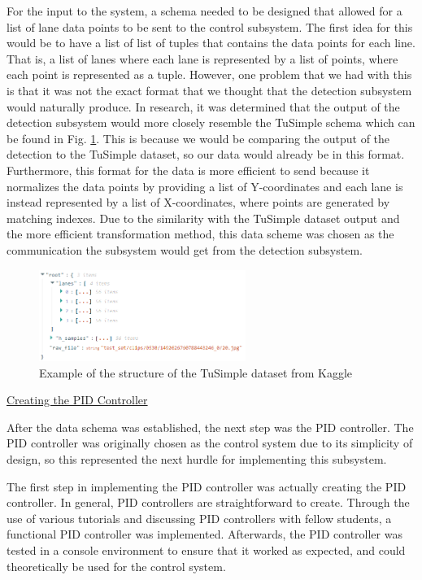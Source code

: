 \documentclass[titlepage,draft]{article}
\begin{document}
{For the input to the system, a schema needed to be designed that allowed for a list of lane data points to be sent to the control subsystem. The first idea for this would be to have a list of list of tuples that contains the data points for each line. That is, a list of lanes where each lane is represented by a list of points, where each point is represented as a tuple. However, one problem that we had with this is that it was not the exact format that we thought that the detection subsystem would naturally produce. In research, it was determined that the output of the detection subsystem would more closely resemble the TuSimple schema which can be found in Fig. \ref{fig:tusimple_dataformat}. This is because we would be comparing the output of the detection to the TuSimple dataset, so our data would already be in this format. Furthermore, this format for the data is more efficient to send because it normalizes the data points by providing a list of Y-coordinates and each lane is instead represented by a list of X-coordinates, where points are generated by matching indexes. Due to the similarity with the TuSimple dataset output and the more efficient transformation method, this data scheme was chosen as the communication the subsystem would get from the detection subsystem.

\begin{figure}
	\centering
	\includegraphics[width=0.6\textwidth]{tusimple_data_example}
	\caption{Example of the structure of the TuSimple dataset from Kaggle \cite{tusimpleStructure}}
	\label{fig:tusimple_dataformat}
\end{figure}

\underline{Creating the PID Controller}

After the data schema was established, the next step was the PID controller. The PID controller was originally chosen as the control system due to its simplicity of design, so this represented the next hurdle for implementing this subsystem.

The first step in implementing the PID controller was actually creating the PID controller. In general, PID controllers are straightforward to create. Through the use of various tutorials and discussing PID controllers with fellow students, a functional PID controller was implemented. Afterwards, the PID controller was tested in a console environment to ensure that it worked as expected, and could theoretically be used for the control system.

}
\end{document}
